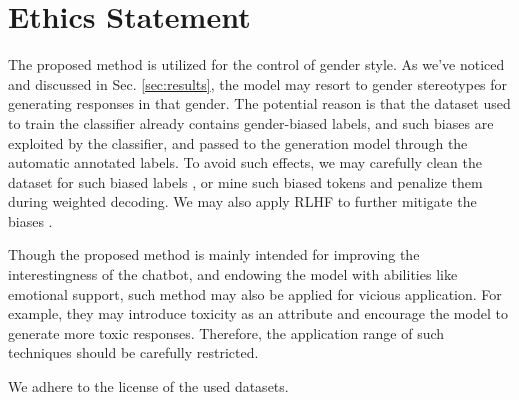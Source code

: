 \section*{Ethics Statement}
The proposed method is utilized for the control of gender style. As we've noticed and discussed in Sec. \ref{sec:results}, the model may resort to gender stereotypes for generating responses in that gender. The potential reason is that the dataset used to train the classifier already contains gender-biased labels, and such biases are exploited by the classifier, and passed to the generation model through the automatic annotated labels. To avoid such effects, we may carefully clean the dataset for such biased labels \cite{gehman2020realtoxicityprompts}, or mine such biased tokens and penalize them during weighted decoding. We may also apply RLHF to further mitigate the biases \citep{ouyang2022training}.

Though the proposed method is mainly intended for improving the interestingness of the chatbot, and endowing the model with abilities like emotional support, such method may also be applied for vicious application. For example, they may introduce toxicity as an attribute and encourage the model to generate more toxic responses. Therefore, the application range of such techniques should be carefully restricted. 

We adhere to the license of the used datasets.
